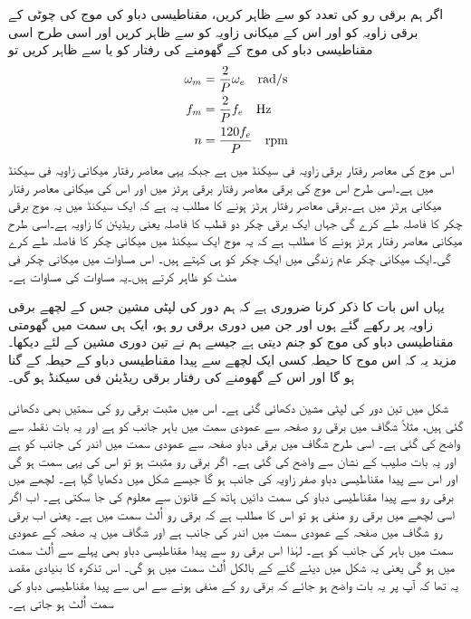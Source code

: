 اگر ہم برقی رو کی تعدد کو  سے ظاہر کریں، مقناطیسی دباو کی موج کی چوٹی کے برقی زاویہ کو   اور اس کے میکانی زاویہ کو  سے ظاہر کریں اور اسی طرح اسی مقناطیسی دباو کی موج کے گھومنے کی رفتار کو  یا  سے ظاہر کریں تو
\begin{gather}
\begin{aligned}\label{مساوات_گھومتے_مشین_برقی_میکانی_رفتار_تعلق}
\omega_m&=\frac{2}{P} \omega_e \quad \si{\radian / \second}\\
f_m&=\frac{2}{P} f_e \quad \si{\hertz}\\
n&=\frac{120 f_e}{P} \quad \textup{rpm}
\end{aligned}
\end{gather}
 اس موج کی معاصر رفتار  برقی زاویہ فی سیکنڈ میں ہے جبکہ   یہی معاصر رفتار میکانی زاویہ فی سیکنڈ میں ہے۔اسی طرح  اس موج کی برقی  معاصر رفتار برقی ہرٹز میں اور  اس کی میکانی معاصر رفتار میکانی ہرٹز میں ہے۔برقی معاصر رفتار   ہرٹز ہونے کا مطلب یہ ہے کہ ایک سیکنڈ میں یہ موج  برقی چکر کا فاصلہ طے کرے گی جہاں ایک برقی چکر دو قطب کا فاصلہ یعنی   ریڈیئن کا زاویہ ہے۔اسی طرح میکانی معاصر رفتار  ہرٹز ہونے کا مطلب ہے کہ یہ موج ایک سیکنڈ میں  میکانی چکر کا فاصلہ طے کرے گی۔ایک میکانی چکر عام زندگی میں ایک چکر کو ہی کہتے ہیں۔ اس مساوات میں  میکانی چکر فی منٹ  کو ظاہر کرتے ہیں۔یہ مساوات  کی مساوات ہے۔

یہاں اس بات کا ذکر کرنا ضروری ہے کہ ہم  دور کی لپٹی مشین جس کے لچھے  برقی زاویہ پر رکھے گئے ہوں اور جن میں   دوری برقی رو  ہو، ایک ہی سمت میں گھومتی مقناطیسی دباو کی موج کو جنم دیتی ہے جیسے ہم نے تین دوری مشین کے لئے دیکھا۔ مزید یہ کہ اس موج کا حیطہ کسی ایک لچھے سے پیدا مقناطیسی دباو کے حیطہ  کے   گنا ہو گا اور اس کے گھومنے کی رفتار  برقی ریڈیئن فی سیکنڈ ہو گی۔

شکل   میں تین دور کی لپٹی مشین دکھائی گئی ہے۔ اس میں مثبت برقی رو کی سمتیں بھی دکھائی گئی ہیں، مثلاً  شگاف میں برقی رو صفحہ سے عمودی سمت میں باہر جانب کو ہے اور یہ بات نقطہ سے واضح کی گئی ہے۔ اسی طرح  شگاف میں برقی دباو صفحہ سے عمودی سمت میں اندر کی جانب کو ہے اور یہ بات صلیب کے نشان سے واضح کی گئی ہے۔ اگر برقی رو مثبت ہو تو اس کی یہی سمت ہو گی اور اس سے پیدا مقناطیسی دباو  صفر زاویہ کی جانب ہو گا جیسے شکل میں دکھایا گیا ہے۔ لچھے میں برقی رو سے پیدا مقناطیسی دباو کی سمت دائیں ہاتھ کے قانون سے معلوم کی جا سکتی ہے۔ اب اگر اسی لچھے میں برقی رو منفی ہو تو اس کا مطلب ہے کہ برقی رو اُلٹ سمت میں ہے۔ یعنی اب برقی رو  شگاف میں صفحہ کے عمودی سمت میں اندر کی جانب ہے اور  شگاف میں یہ صفحہ کے عمودی سمت میں باہر کی جانب کو ہے۔ لہٰذا اس برقی رو سے پیدا مقناطیسی دباو بھی پہلے سے اُلٹ سمت میں ہو گی یعنی یہ شکل میں دیئے گئے    کے بالکل اُلٹ سمت میں ہو گی۔ اس تذکرہ کا بنیادی مقصد یہ تھا کہ آپ پر یہ بات واضح ہو جائے کہ برقی رو کے منفی ہونے سے اس سے پیدا مقناطیسی دباو کی سمت اُلٹ ہو جاتی ہے۔

